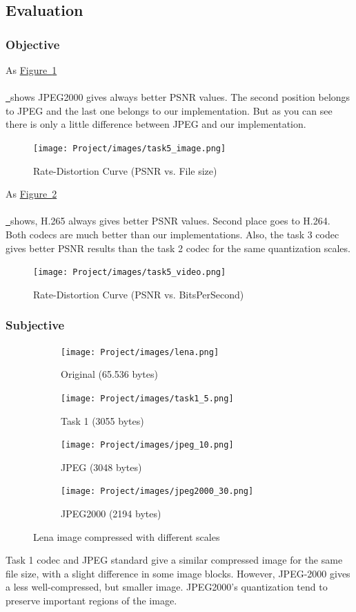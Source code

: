 \documentclass{article}
\newcommand*{\figref}[2][]{%
  \hyperref[{fig:#2}]{%
    Figure~\ref*{fig:#2}%
    \ifx\\#1\\%
    \else
      \,#1%
    \fi
  }%
}
\begin{document}
\subsection{Evaluation}
\subsubsection{Objective}

As \figref{task5img} shows JPEG2000 gives always better PSNR values. The second position belongs to JPEG and the last one belongs to our implementation. But as you can see there is only a little difference between JPEG and our implementation.


\begin{figure}[H]
  \centering
  \texttt{[image: Project/images/task5\_image.png]}
  \caption{Rate-Distortion Curve (PSNR vs. File size)}
  \label{fig:task5img}
\end{figure}

As \figref{task5vid} shows, H.265 always gives better PSNR values. Second place goes to H.264. Both codecs are much better than our implementations. Also, the task 3 codec gives better PSNR results than the task 2 codec for the same quantization scales.

\begin{figure}[H]
  \centering
  \texttt{[image: Project/images/task5\_video.png]}
  \caption{Rate-Distortion Curve (PSNR vs. BitsPerSecond)}
  \label{fig:task5vid}
\end{figure}

\subsubsection{Subjective}

\begin{figure}[H]
  \centering
  
  \begin{subfigure}{0.45\textwidth}
    \centering
    \texttt{[image: Project/images/lena.png]}
    \caption{Original (65.536 bytes)}
    \label{fig:subfig11}
  \end{subfigure}
  \hfill
  \begin{subfigure}{0.45\textwidth}
    \centering
    \texttt{[image: Project/images/task1\_5.png]}
    \caption{Task 1 (3055 bytes)}
    \label{fig:subfig22}
  \end{subfigure}
  
  \vspace{1em}
  
  \begin{subfigure}{0.45\textwidth}
    \centering
    \texttt{[image: Project/images/jpeg\_10.png]}
    \caption{JPEG (3048 bytes)}
    \label{fig:subfig33}
  \end{subfigure}
  \hfill
  \begin{subfigure}{0.45\textwidth}
    \centering
    \texttt{[image: Project/images/jpeg2000\_30.png]}
    \caption{JPEG2000 (2194 bytes)}
    \label{fig:subfig44}
  \end{subfigure}
  
  \caption{Lena image compressed with different scales}
  \label{fig:subplots2}
\end{figure}

Task 1 codec and JPEG standard give a similar compressed image for the same file size, with a slight difference in some image blocks. However, JPEG-2000 gives a less well-compressed, but smaller image. JPEG2000's quantization tend to preserve important regions of the image.
\end{document}

